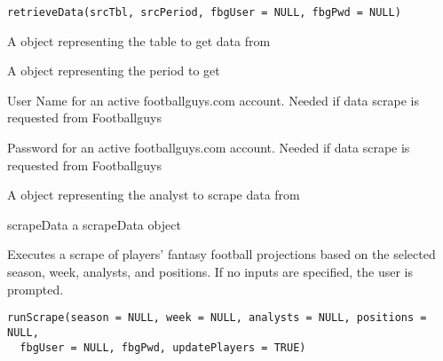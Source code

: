 \documentclass[a4paper]{book}
\begin{document}
%
\begin{Usage}
\begin{verbatim}
retrieveData(srcTbl, srcPeriod, fbgUser = NULL, fbgPwd = NULL)
\end{verbatim}
\end{Usage}
%
\begin{Arguments}
\begin{ldescription}
\item[\code{srcTbl}] A  object representing the table to get data from

\item[\code{srcPeriod}] A  object representing the period to get

\item[\code{fbgUser}] User Name for an active footballguys.com account. Needed if
data scrape is requested from Footballguys

\item[\code{fbgPwd}] Password for an active footballguys.com account. Needed if
data scrape is requested from Footballguys

\item[\code{srcAnalyst}] A  object representing the analyst
to scrape data from
\end{ldescription}
\end{Arguments}
%
\begin{Value}
scrapeData a scrapeData object
\end{Value}
%
\begin{Description}\relax
Executes a scrape of players' fantasy football projections based on the selected
season, week, analysts, and positions. If no inputs are specified, the user is prompted.
\end{Description}
%
\begin{Usage}
\begin{verbatim}
runScrape(season = NULL, week = NULL, analysts = NULL, positions = NULL,
  fbgUser = NULL, fbgPwd, updatePlayers = TRUE)
\end{verbatim}
\end{Usage}
%
\end{document}
